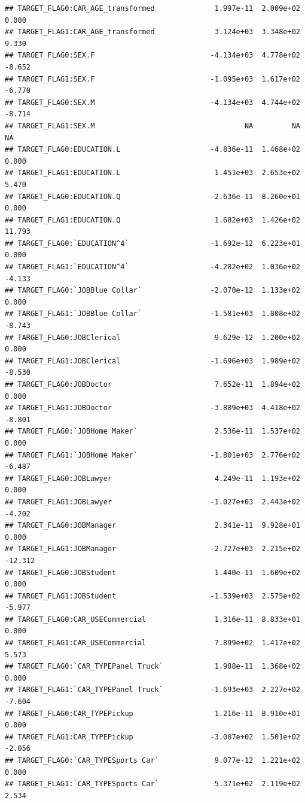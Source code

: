\documentclass[
]{article}
\begin{document}
\begin{verbatim}
## TARGET_FLAG0:CAR_AGE_transformed              1.997e-11  2.009e+02   0.000
## TARGET_FLAG1:CAR_AGE_transformed              3.124e+03  3.348e+02   9.330
## TARGET_FLAG0:SEX.F                           -4.134e+03  4.778e+02  -8.652
## TARGET_FLAG1:SEX.F                           -1.095e+03  1.617e+02  -6.770
## TARGET_FLAG0:SEX.M                           -4.134e+03  4.744e+02  -8.714
## TARGET_FLAG1:SEX.M                                   NA         NA      NA
## TARGET_FLAG0:EDUCATION.L                     -4.836e-11  1.468e+02   0.000
## TARGET_FLAG1:EDUCATION.L                      1.451e+03  2.653e+02   5.470
## TARGET_FLAG0:EDUCATION.Q                     -2.636e-11  8.260e+01   0.000
## TARGET_FLAG1:EDUCATION.Q                      1.682e+03  1.426e+02  11.793
## TARGET_FLAG0:`EDUCATION^4`                   -1.692e-12  6.223e+01   0.000
## TARGET_FLAG1:`EDUCATION^4`                   -4.282e+02  1.036e+02  -4.133
## TARGET_FLAG0:`JOBBlue Collar`                -2.070e-12  1.133e+02   0.000
## TARGET_FLAG1:`JOBBlue Collar`                -1.581e+03  1.808e+02  -8.743
## TARGET_FLAG0:JOBClerical                      9.629e-12  1.200e+02   0.000
## TARGET_FLAG1:JOBClerical                     -1.696e+03  1.989e+02  -8.530
## TARGET_FLAG0:JOBDoctor                        7.652e-11  1.894e+02   0.000
## TARGET_FLAG1:JOBDoctor                       -3.889e+03  4.418e+02  -8.801
## TARGET_FLAG0:`JOBHome Maker`                  2.536e-11  1.537e+02   0.000
## TARGET_FLAG1:`JOBHome Maker`                 -1.801e+03  2.776e+02  -6.487
## TARGET_FLAG0:JOBLawyer                        4.249e-11  1.193e+02   0.000
## TARGET_FLAG1:JOBLawyer                       -1.027e+03  2.443e+02  -4.202
## TARGET_FLAG0:JOBManager                       2.341e-11  9.928e+01   0.000
## TARGET_FLAG1:JOBManager                      -2.727e+03  2.215e+02 -12.312
## TARGET_FLAG0:JOBStudent                       1.440e-11  1.609e+02   0.000
## TARGET_FLAG1:JOBStudent                      -1.539e+03  2.575e+02  -5.977
## TARGET_FLAG0:CAR_USECommercial                1.316e-11  8.833e+01   0.000
## TARGET_FLAG1:CAR_USECommercial                7.899e+02  1.417e+02   5.573
## TARGET_FLAG0:`CAR_TYPEPanel Truck`            1.988e-11  1.368e+02   0.000
## TARGET_FLAG1:`CAR_TYPEPanel Truck`           -1.693e+03  2.227e+02  -7.604
## TARGET_FLAG0:CAR_TYPEPickup                   1.216e-11  8.910e+01   0.000
## TARGET_FLAG1:CAR_TYPEPickup                  -3.087e+02  1.501e+02  -2.056
## TARGET_FLAG0:`CAR_TYPESports Car`             9.077e-12  1.221e+02   0.000
## TARGET_FLAG1:`CAR_TYPESports Car`             5.371e+02  2.119e+02   2.534

\end{verbatim}
\end{document}
